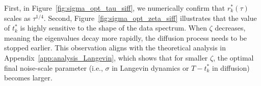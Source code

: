 \documentclass[11pt]{article}
\begin{document}
First, in Figure~\ref{fig:sigma_opt_tau_siff}, we numerically confirm that $r_k^*(\tau)$ scales as $\tau^{1/4}$. Second, Figure~\ref{fig:sigma_opt_zeta_siff} illustrates that the value of $t_k^*$ is highly sensitive to the shape of the data spectrum. When $\zeta$ decreases, meaning the eigenvalues decay more rapidly, the diffusion process needs to be stopped earlier. This observation aligns with the theoretical analysis in Appendix~\ref{app:analysis_Langevin}, which shows that for smaller $\zeta$, the optimal final noise-scale parameter (i.e., $\sigma$ in Langevin dynamics or $T - t_k^*$ in diffusion) becomes larger.
\end{document}
